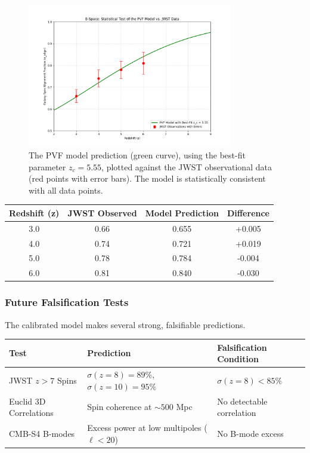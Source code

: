 \documentclass{BSpacePaper} %
\begin{document}
\begin{appendices}
\begin{figure}[h!]
    \centering
    \includegraphics[width=0.8\textwidth]{PVF_model_prediction.png} %
    \caption{The PVF model prediction (green curve), using the best-fit parameter $z_c = 5.55$, plotted against the JWST observational data (red points with error bars). The model is statistically consistent with all data points.}
    \label{fig:main_plot}
\end{figure}

\begin{center}
    \captionsetup{type=table}
    \label{tab:results}
    \begin{tabular}{@{}cccc@{}}
    \toprule
    \textbf{Redshift (z)} & \textbf{JWST Observed} & \textbf{Model Prediction} & \textbf{Difference} \\ \midrule
    3.0 & 0.66 & 0.655 & +0.005 \\
    4.0 & 0.74 & 0.721 & +0.019 \\
    5.0 & 0.78 & 0.784 & -0.004 \\
    6.0 & 0.81 & 0.840 & -0.030 \\ \bottomrule
    \end{tabular}
\end{center}

\subsubsection{Future Falsification Tests}
The calibrated model makes several strong, falsifiable predictions.

\begin{center}
    \captionsetup{type=table}
    \begin{tabular}{@{}lll@{}}
    \toprule
    \textbf{Test} & \textbf{Prediction} & \textbf{Falsification Condition} \\ \midrule
    JWST $z>7$ Spins & $\sigma(z=8) = 89\%$, $\sigma(z=10) = 95\%$ & $\sigma(z=8) < 85\%$ \\
    Euclid 3D Correlations & Spin coherence at $\sim 500$ Mpc & No detectable correlation \\
    CMB-S4 B-modes & Excess power at low multipoles ($\ell < 20$) & No B-mode excess \\ \bottomrule
    \end{tabular}
\end{center}


\end{appendices}
\end{document}
